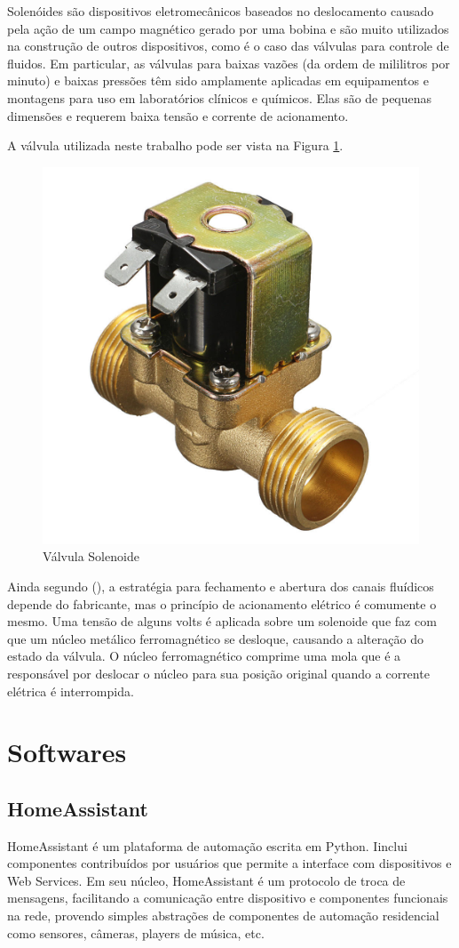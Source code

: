 Solenóides são dispositivos eletromecânicos baseados no deslocamento causado pela ação de um campo magnético gerado por uma bobina e são muito utilizados na construção de outros dispositivos, como é o caso das válvulas para controle de fluidos. Em particular, as válvulas para baixas vazões (da ordem de mililitros por minuto) e baixas pressões têm sido amplamente aplicadas em equipamentos e montagens para uso em laboratórios clínicos e químicos. Elas são de pequenas dimensões e requerem baixa tensão e corrente de acionamento. \cite{da2002modulo}

A válvula utilizada neste trabalho pode ser vista na Figura \ref{fig:valvula-solenoide}.

\begin{figure}[htbp]
	\centering
	\includegraphics[width=0.3\linewidth]{figuras/valvula-solenoide.jpg}
	\caption{Válvula Solenoide}
	\label{fig:valvula-solenoide}
\end{figure}

Ainda segundo \citeauthor{da2002modulo} (\citeyear{da2002modulo}), a estratégia para fechamento e abertura dos canais fluídicos depende do fabricante, mas o princípio de acionamento elétrico é comumente o mesmo. Uma tensão de alguns volts é aplicada sobre um solenoide que faz com que um núcleo metálico ferromagnético se desloque, causando a alteração do estado da válvula. O núcleo
ferromagnético comprime uma mola que é a responsável por deslocar o núcleo para sua posição original quando a corrente elétrica é interrompida.

\section{Softwares}

\subsection{HomeAssistant}

HomeAssistant é um plataforma de automação escrita em Python. Iinclui componentes contribuídos por usuários que permite a interface com dispositivos e Web Services. \cite{Lundrigan2017} Em seu núcleo, HomeAssistant é um protocolo de troca de mensagens, facilitando a comunicação entre dispositivo e componentes funcionais na rede, provendo simples abstrações de componentes de automação residencial como sensores, câmeras, players de música, etc.


